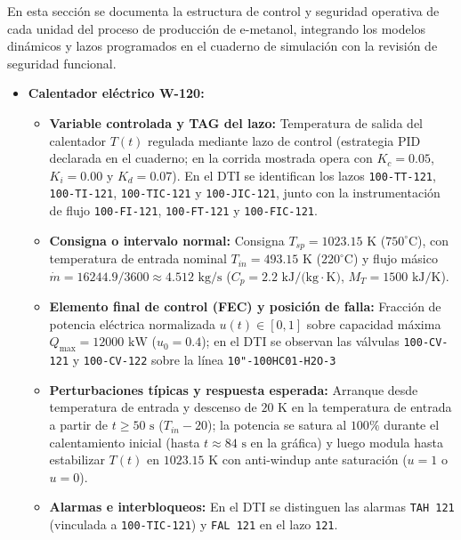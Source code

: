 \documentclass[11pt,letterpaper]{article}
\begin{document}
En esta sección se documenta la estructura de control y seguridad operativa de cada unidad del proceso de producción de e-metanol, integrando los modelos dinámicos y lazos programados en el cuaderno de simulación con la revisión de seguridad funcional.

\begin{itemize}
    \item \textbf{Calentador eléctrico W-120:}
    \begin{itemize}
        \item \textbf{Variable controlada y TAG del lazo:} Temperatura de salida del calentador $T(t)$ regulada mediante lazo de control (estrategia PID declarada en el cuaderno; en la corrida mostrada opera con $K_c = 0.05$, $K_i = 0.00$ y $K_d = 0.07$). En el DTI se identifican los lazos \texttt{100-TT-121}, \texttt{100-TI-121}, \texttt{100-TIC-121} y \texttt{100-JIC-121}, junto con la instrumentación de flujo \texttt{100-FI-121}, \texttt{100-FT-121} y \texttt{100-FIC-121}. 
        \item \textbf{Consigna o intervalo normal:} Consigna $T_{sp} = 1023.15\text{ K}$ ($750^\circ\text{C}$), con temperatura de entrada nominal $T_{in} = 493.15\text{ K}$ ($220^\circ\text{C}$) y flujo másico $\dot{m} = 16244.9/3600 \approx 4.512\text{ kg/s}$ ($C_p = 2.2\text{ kJ/(kg}\cdot\text{K)}$, $M_T = 1500\text{ kJ/K}$).
        \item \textbf{Elemento final de control (FEC) y posición de falla:} Fracción de potencia eléctrica normalizada $u(t) \in [0, 1]$ sobre capacidad máxima $Q_{\max} = 12000\text{ kW}$ ($u_0 = 0.4$); en el DTI se observan las válvulas \texttt{100-CV-121} y \texttt{100-CV-122} sobre la línea \texttt{10"-100HC01-H2O-3}
        \item \textbf{Perturbaciones típicas y respuesta esperada:} Arranque desde temperatura de entrada y descenso de $20\text{ K}$ en la temperatura de entrada a partir de $t \ge 50\text{ s}$ ($T_{in} - 20$); la potencia se satura al $100\%$ durante el calentamiento inicial (hasta $t \approx 84\text{ s}$ en la gráfica) y luego modula hasta estabilizar $T(t)$ en $1023.15\text{ K}$ con anti-windup ante saturación ($u=1$ o $u=0$).
        \item \textbf{Alarmas e interbloqueos:} En el DTI se distinguen las alarmas \texttt{TAH 121} (vinculada a \texttt{100-TIC-121}) y \texttt{FAL 121} en el lazo \texttt{121}.
    \end{itemize}
 

\end{itemize}
\end{document}
